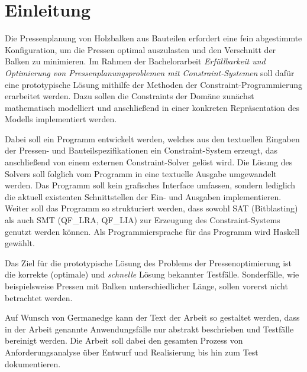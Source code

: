 \section{Einleitung}

Die Pressenplanung von Holzbalken aus Bauteilen erfordert eine fein abgestimmte Konfiguration, um die Pressen optimal auszulasten und den Verschnitt der Balken zu minimieren.
Im Rahmen der Bachelorarbeit \textit{Erfüllbarkeit und Optimierung von Pressenplanungsproblemen mit Constraint-Systemen} soll dafür eine prototypische Lösung mithilfe der Methoden der Constraint-Programmierung erarbeitet werden.
Dazu sollen die Constraints der Domäne zunächst mathematisch modelliert und anschließend in einer konkreten Repräsentation des Modells implementiert werden.

Dabei soll ein Programm entwickelt werden, welches aus den textuellen Eingaben der Pressen- und Bauteilspezifikationen ein Constraint-System erzeugt, das anschließend von einem externen Constraint-Solver gelöst wird.
Die Lösung des Solvers soll folglich vom Programm in eine textuelle Ausgabe umgewandelt werden.
Das Programm soll kein grafisches Interface umfassen, sondern lediglich die aktuell existenten Schnittstellen der Ein- und Ausgaben implementieren.
Weiter soll das Programm so strukturiert werden, dass sowohl SAT (Bitblasting) als auch SMT (QF\_LRA, QF\_LIA) zur Erzeugung des Constraint-Systems genutzt werden können.
Als Programmiersprache für das Programm wird Haskell gewählt.

Das Ziel für die prototypische Lösung des Problems der Pressenoptimierung ist die korrekte (optimale) und \textit{schnelle} Lösung bekannter Testfälle.
Sonderfälle, wie beispielsweise Pressen mit Balken unterschiedlicher Länge, sollen vorerst nicht betrachtet werden.

Auf Wunsch von Germanedge kann der Text der Arbeit so gestaltet werden, dass in der Arbeit genannte Anwendungsfälle nur abstrakt beschrieben und Testfälle bereinigt werden.
Die Arbeit soll dabei den gesamten Prozess von Anforderungsanalyse über Entwurf und Realisierung bis hin zum Test dokumentieren.